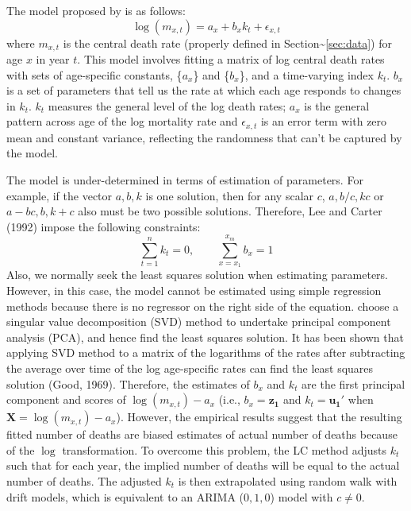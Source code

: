 \documentclass[11pt,a4paper,]{article}
\begin{document}
The model proposed by \textcite{LC92} is as follows:
\begin{equation}
  \log(m_{x,t})=a_x+b_xk_t+\epsilon_{x,t}
\end{equation}
where \(m_{x,t}\) is the central death rate (properly defined in Section\textasciitilde\ref{sec:data}) for age \(x\) in year \(t\). This model involves fitting a matrix of log central death rates with sets of age-specific constants, \{\(a_x\)\} and \{\(b_x\)\}, and a time-varying index \(k_t\). \(b_x\) is a set of parameters that tell us the rate at which each age responds to changes in \(k_t\). \(k_t\) measures the general level of the log death rates; \(a_x\) is the general pattern across age of the log mortality rate and \(\epsilon_{x,t}\) is an error term with zero mean and constant variance, reflecting the randomness that can't be captured by the model.

The model is under-determined in terms of estimation of parameters. For example, if the vector \(a,b,k\) is one solution, then for any scalar \(c\), \(a, b/c, kc\) or \(a - bc, b, k+c\) also must be two possible solutions. Therefore, Lee and Carter (1992) impose the following constraints:
\begin{equation}
  \sum_{t=1}^{n}k_t=0, \qquad \sum_{x=x_1}^{x_m}b_x=1
\end{equation}
Also, we normally seek the least squares solution when estimating parameters. However, in this case, the model cannot be estimated using simple regression methods because there is no regressor on the right side of the equation. \textcite{LC92} choose a singular value decomposition (SVD) method to undertake principal component analysis (PCA), and hence find the least squares solution. It has been shown that applying SVD method to a matrix of the logarithms of the rates after subtracting the average over time of the log age-specific rates can find the least squares solution (Good, 1969). Therefore, the estimates of \(b_x\) and \(k_t\) are the first principal component and scores of \(\log(m_{x,t})-a_x\) (i.e., \(b_x=\bm{z_1}\) and \(k_t=\bm{u_1}'\) when \(\bm{X}=\log(m_{x,t})-a_x\)). However, the empirical results suggest that the resulting fitted number of deaths are biased estimates of actual number of deaths because of the \(\log\) transformation. To overcome this problem, the LC method adjusts \(k_t\) such that for each year, the implied number of deaths will be equal to the actual number of deaths. The adjusted \(k_t\) is then extrapolated using random walk with drift models, which is equivalent to an ARIMA (\(0,1,0\)) model with \(c\neq0\).
\end{document}
